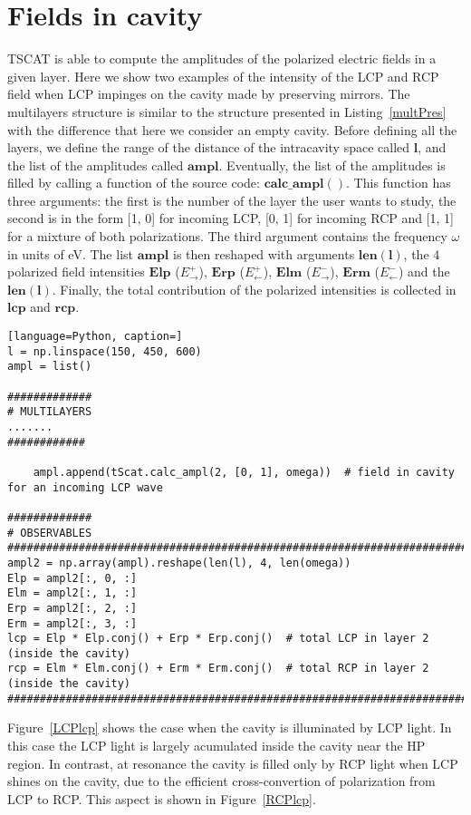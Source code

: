 \documentclass[aps,prl,10pt,onecolumn,superscriptaddress]{revtex4-2}
\begin{document}
\section{Fields in cavity}
TSCAT is able to compute the amplitudes of the polarized electric fields in a given layer. Here we show two examples of the intensity of the LCP and RCP field when LCP impinges on the cavity made by preserving mirrors. The multilayers structure is similar to the structure presented in Listing~\ref{multPres} with the difference that here we consider an empty cavity. Before defining all the layers, we define the range of the distance of the intracavity space called $\mathbf{l}$, and the list of the amplitudes called $\mathbf{ampl}$. Eventually, the list of the amplitudes is filled by calling a function of the source code: $\mathbf{calc\_ampl()}$. This function has three arguments: the first is the number of the layer the user wants to study, the second is in the form [1, 0] for incoming LCP, [0, 1] for incoming RCP and [1, 1] for a mixture of both polarizations. The third argument contains the frequency $\omega$ in units of eV. The list $\mathbf{ampl}$ is then reshaped with arguments $\mathbf{len(l)}$, the 4 polarized field intensities $\mathbf{Elp}$ ($E^{+}_{\rightarrow}$), $\mathbf{Erp}$ ($E^{+}_{\leftarrow}$), $\mathbf{Elm}$ ($E^{-}_{\rightarrow}$), $\mathbf{Erm}$ ($E^{-}_{\leftarrow}$) and the $\mathbf{len(l)}$. Finally, the total contribution of the polarized intensities is collected in $\mathbf{lcp}$ and $\mathbf{rcp}$.
\begin{lstlisting}[language=Python, caption=]
l = np.linspace(150, 450, 600)
ampl = list()

#############
# MULTILAYERS
.......
############

    ampl.append(tScat.calc_ampl(2, [0, 1], omega))  # field in cavity for an incoming LCP wave

#############
# OBSERVABLES
#####################################################################################
ampl2 = np.array(ampl).reshape(len(l), 4, len(omega)) 
Elp = ampl2[:, 0, :]
Elm = ampl2[:, 1, :]
Erp = ampl2[:, 2, :]
Erm = ampl2[:, 3, :]
lcp = Elp * Elp.conj() + Erp * Erp.conj()  # total LCP in layer 2 (inside the cavity)
rcp = Elm * Elm.conj() + Erm * Erm.conj()  # total RCP in layer 2 (inside the cavity)
#####################################################################################
\end{lstlisting}
Figure~\ref{LCPlcp} shows the case when the cavity is illuminated by LCP light. In this case the LCP light is largely acumulated inside the cavity near the HP region. In contrast, at resonance the cavity is filled only by RCP light when LCP shines on the cavity, due to the efficient cross-convertion of polarization from LCP to RCP\@. This aspect is shown in Figure~\ref{RCPlcp}.
\end{document}
